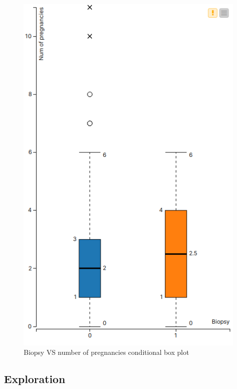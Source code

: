 \begin{figure}
    \centerline{
        \includegraphics[width=0.25\paperwidth]{figures/boxplot1.png}}
    \caption{Biopsy VS number of pregnancies conditional box plot}
    \label{cond_box_plot}
\end{figure}

\subsection{Exploration}

